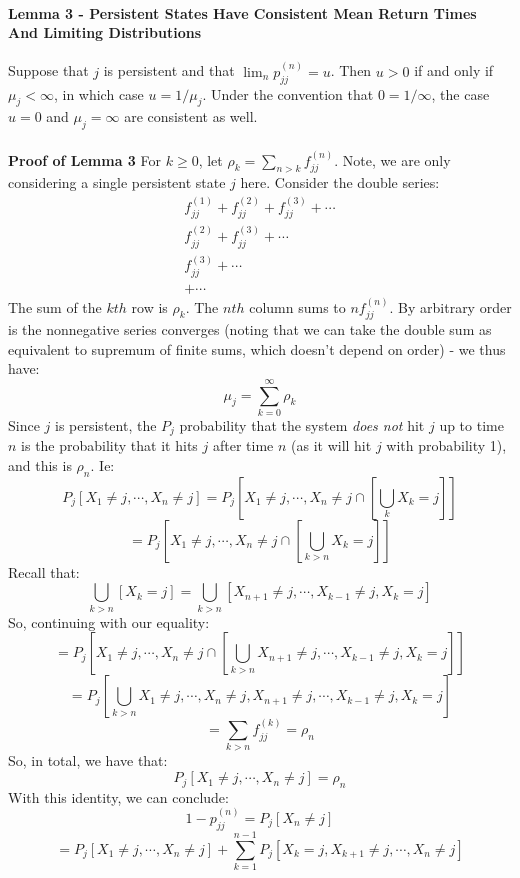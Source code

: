 \documentclass[12pt,a4paper]{article}
\newcommand{\1}[1]{\mathbbm{1}\left\{ #1 \right\}}
\begin{document}
\paragraph{Lemma 3 - Persistent States Have Consistent Mean Return Times And Limiting Distributions} Suppose that $j$ is persistent and that $\lim_n p_{jj}^{(n)} = u$. Then $u > 0$ if and only if $\mu_j < \infty$, in which case $u = 1/\mu_j$. Under the convention that $0 = 1/\infty$, the case $u = 0$ and $\mu_j = \infty$ are consistent as well.
\\\\
\textbf{Proof of Lemma 3} For $k \geq 0$, let $\rho_k = \sum_{n > k} f_{jj}^{(n)}$. Note, we are only considering a single persistent state $j$ here. Consider the double series:
\begin{align*}
f_{jj}^{(1)} + f_{jj}^{(2)} + f_{jj}^{(3)} + \cdots\\
f_{jj}^{(2)} + f_{jj}^{(3)} + \cdots\\
f_{jj}^{(3)} + \cdots\\
+ \cdots
\end{align*}
The sum of the $kth$ row is $\rho_k$. The $nth$ column sums to $nf_{jj}^{(n)}$. By arbitrary order is the nonnegative series converges (noting that we can take the double sum as equivalent to supremum of finite sums, which doesn't depend on order) - we thus have:
$$
	\mu_j = \sum_{k=0}^\infty \rho_k
$$
Since $j$ is persistent, the $P_j$ probability that the system \textit{does not} hit $j$ up to time $n$ is the probability that it hits $j$ after time $n$ (as it will hit $j$ with probability 1), and this is $\rho_n$. Ie:
$$
	P_j\left[X_1 \neq j, \cdots, X_n \neq j\right] =
	P_j\left[X_1 \neq j, \cdots, X_n \neq j \cap \left[\bigcup_k X_k = j\right]\right]
$$
$$
	=
	P_j\left[X_1 \neq j, \cdots, X_n \neq j \cap \left[\bigcup_{k > n} X_k = j\right]\right]
$$
Recall that:
$$
	\bigcup_{k > n} \left[X_k = j\right] =
	\bigcup_{k > n} \left[X_{n + 1} \neq j, \cdots, X_{k-1} \neq j, X_k = j\right]
$$
So, continuing with our equality:
$$
	=
	P_j\left[X_1 \neq j, \cdots, X_n \neq j \cap \left[\bigcup_{k > n} X_{n + 1} \neq j, \cdots, X_{k-1} \neq j, X_k = j\right]\right]
$$
$$
	=
	P_j\left[\bigcup_{k > n} X_1 \neq j, \cdots, X_n \neq j, X_{n + 1} \neq j, \cdots, X_{k-1} \neq j, X_k = j\right]
$$
$$
	= \sum_{k > n} f_{jj}^{(k)} = \rho_n
$$
So, in total, we have that:
$$
	P_j\left[X_1 \neq j, \cdots, X_n \neq j\right] = \rho_n
$$
With this identity, we can conclude:
$$
	1 - p_{jj}^{(n)} = P_j\left[X_n \neq j\right]
$$
$$
	= P_j\left[X_1 \neq j, \cdots, X_n \neq j\right] +
	\sum_{k=1}^{n-1} P_j\left[X_k = j, X_{k+1} \neq j, \cdots, X_n \neq j\right]
$$
\end{document}

